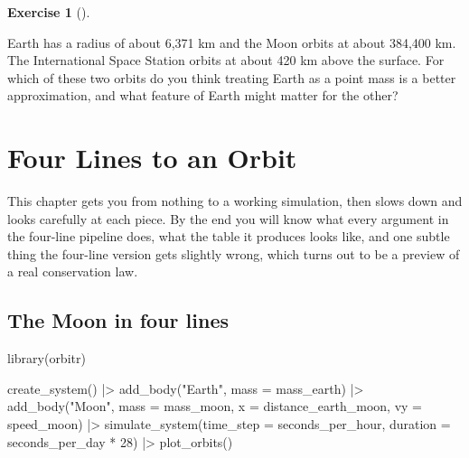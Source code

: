 \documentclass[
  10.5pt,
  letterpaper,
]{scrbook}
\newenvironment{Shaded}{\begin{snugshade}}{\end{snugshade}}
\newcommand{\AttributeTok}[1]{\textcolor[rgb]{0.00,0.00,0.00}{#1}}
\newcommand{\DecValTok}[1]{\textcolor[rgb]{0.00,0.00,0.00}{#1}}
\newcommand{\FunctionTok}[1]{\textcolor[rgb]{0.00,0.00,0.00}{#1}}
\newcommand{\NormalTok}[1]{\textcolor[rgb]{0.00,0.00,0.00}{#1}}
\newcommand{\SpecialCharTok}[1]{\textcolor[rgb]{0.00,0.00,0.00}{#1}}
\newcommand{\StringTok}[1]{\textcolor[rgb]{0.00,0.00,0.00}{#1}}
\theoremstyle{definition}
\newtheorem{exercise}{Exercise}[chapter]
\theoremstyle{plain}
\theoremstyle{remark}
\begin{document}
\begin{exercise}[]\protect\hypertarget{exr-ch1-point-mass}{}\label{exr-ch1-point-mass}

Earth has a radius of about 6,371 km and the Moon orbits at about
384,400 km. The International Space Station orbits at about 420 km above
the surface. For which of these two orbits do you think treating Earth
as a point mass is a better approximation, and what feature of Earth
might matter for the other?

\end{exercise}

\chapter{Four Lines to an Orbit}\label{sec-four-lines}

This chapter gets you from nothing to a working simulation, then slows
down and looks carefully at each piece. By the end you will know what
every argument in the four-line pipeline does, what the table it
produces looks like, and one subtle thing the four-line version gets
slightly wrong, which turns out to be a preview of a real conservation
law.

\section{The Moon in four lines}\label{the-moon-in-four-lines}

\begin{Shaded}
\begin{Highlighting}[]
\FunctionTok{library}\NormalTok{(orbitr)}

\FunctionTok{create\_system}\NormalTok{() }\SpecialCharTok{|\textgreater{}}
  \FunctionTok{add\_body}\NormalTok{(}\StringTok{"Earth"}\NormalTok{, }\AttributeTok{mass =}\NormalTok{ mass\_earth) }\SpecialCharTok{|\textgreater{}}
  \FunctionTok{add\_body}\NormalTok{(}\StringTok{"Moon"}\NormalTok{, }\AttributeTok{mass =}\NormalTok{ mass\_moon, }\AttributeTok{x =}\NormalTok{ distance\_earth\_moon, }\AttributeTok{vy =}\NormalTok{ speed\_moon) }\SpecialCharTok{|\textgreater{}}
  \FunctionTok{simulate\_system}\NormalTok{(}\AttributeTok{time\_step =}\NormalTok{ seconds\_per\_hour, }\AttributeTok{duration =}\NormalTok{ seconds\_per\_day }\SpecialCharTok{*} \DecValTok{28}\NormalTok{) }\SpecialCharTok{|\textgreater{}}
  \FunctionTok{plot\_orbits}\NormalTok{()}
\end{Highlighting}
\end{Shaded}
\end{document}

